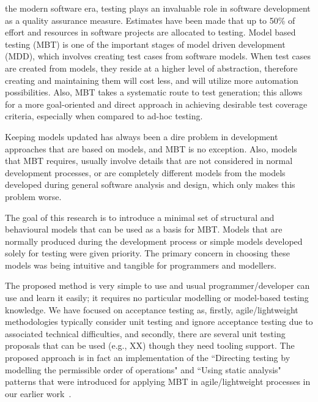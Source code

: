 %
%
\label{sec:introduction}
 the modern software era, testing plays an invaluable role in software development as a quality assurance measure. Estimates have been made that up to 50\% of effort and resources in software projects are allocated to testing. Model based testing (MBT) is one of the important stages of model driven development (MDD), which involves creating test cases from software models. When test cases are created from models, they reside at a higher level of abstraction, therefore creating and maintaining them will cost less, and will utilize more automation possibilities. Also, MBT takes a systematic route to test generation; this allows for a more goal-oriented and direct approach in achieving desirable test coverage criteria, especially when compared to ad-hoc testing. 

Keeping models updated has always been a dire problem in development approaches that are based on models, and MBT is no exception. Also, models that MBT requires, usually involve details that are not considered in normal development processes, or are completely different models from the models developed during general software analysis and design, which only makes this problem worse.

The goal of this research is to introduce a minimal set of structural and behavioural models that can be used as a basis for MBT. Models that are normally produced during the development process or simple models developed solely for testing were given priority. The primary concern in choosing these models was being intuitive and tangible for programmers and modellers.

The proposed method is very simple to use and usual programmer/developer can use and learn it easily; it requires no particular modelling or model-based testing knowledge. We have focused on acceptance testing as, firstly, agile/lightweight methodologies typically consider unit testing and ignore acceptance testing due to associated technical difficulties, and secondly, there are several unit testing proposals that can be used (e.g., XX) though they need tooling support. The proposed approach is in fact an implementation of  the ``Directing testing by modelling the permissible order of operations" and ``Using static analysis" patterns that were introduced for applying MBT in agile/lightweight processes in our earlier work~\cite{Jalalinasab2012}.

